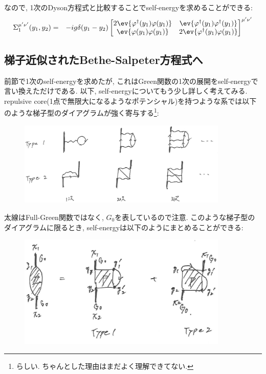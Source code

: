 \documentclass[10.5pt,a4paper]{jreport}
\begin{document}
なので, 1次のDyson方程式と比較することでself-energyを求めることができる:
\begin{eqnarray}
  \Sigma^{\mu'\nu'}_1(y_1, y_2) &=& -ig\delta(y_1-y_2)
  \begin{bmatrix}
    2\ev{\varphi^\dagger(y_1)\varphi(y_1)}&\ev{\varphi^\dagger(y_1)\varphi^\dagger(y_1)}\\
    \ev{\varphi(y_1)\varphi(y_1)}&2\ev{\varphi^\dagger(y_1)\varphi(y_1)}
  \end{bmatrix}^{\mu'\nu'}\label{1st-self-energy}
\end{eqnarray}
\subsection{梯子近似されたBethe-Salpeter方程式へ}
前節で1次のself-energyを求めたが, これはGreen関数の1次の展開をself-energyで言い換えただけである. 以下, self-energyについてもう少し詳しく考えてみる.
repulsive core(1点で無限大になるようなポテンシャル)を持つような系では以下のような梯子型のダイアグラムが強く寄与する\footnote{らしい. ちゃんとした理由はまだよく理解できてない. }:
\begin{figure}[htbp]
  \begin{center}
    \includegraphics[width = 10cm]{./EPS/ladder1.eps}
  \end{center}
  \label{self-consistent}
\end{figure}
太線はFull-Green関数ではなく, $G_0$を表しているので注意. このような梯子型のダイアグラムに限るとき, self-energyは以下のようにまとめることができる:
\begin{figure}[htbp]
  \begin{center}
    \includegraphics[width = 10cm]{./EPS/ladder2.eps}
  \end{center}
  \label{self-consistent}
\end{figure}
\end{document}
